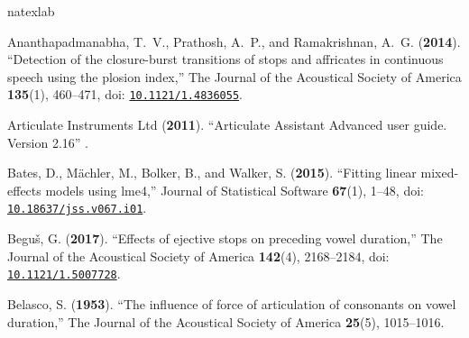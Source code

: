 \documentclass[preprint]{JASAnew}
\begin{document}
\begin{thebibliography}{75}
\def\enquote#1{``#1,''}
\def\plainquote#1{``#1''}
\expandafter\ifx\csname natexlab\endcsname\relax\def\natexlab#1{#1}\fi
\providecommand{\dourl}[1]{\href{http://#1}{\nolinkurl{#1}}}
\providecommand{\bibinfo}[2]{#2}
\providecommand{\noopsort}[1]{}
\providecommand{\switchargs}[2]{#2#1}
  \def\eatspace #1{#1}
\providecommand{\dodoi}[1]{doi: \href{http://dx.doi.org/#1}{\nolinkurl{#1}}}

\bibinfo{author}{Ananthapadmanabha, T.~V.}, \bibinfo{author}{Prathosh, A.~P.},
  and \bibinfo{author}{Ramakrishnan, A.~G.} (\textbf{\bibinfo{year}{2014}}).
  \enquote{\bibinfo{title}{Detection of the closure-burst transitions of stops
  and affricates in continuous speech using the plosion index}}
  \bibinfo{journal}{The Journal of the Acoustical Society of America}
  \textbf{135}(1), \bibinfo{pages}{460--471}, \dodoi{10.1121/1.4836055}.

\bibinfo{author}{{Articulate Instruments Ltd{\texttrademark}}}
  (\textbf{\bibinfo{year}{2011}}). \plainquote{\bibinfo{title}{{Articulate
  Assistant Advanced} user guide. {V}ersion 2.16}} .

\bibinfo{author}{Bates, D.}, \bibinfo{author}{M{\"a}chler, M.},
  \bibinfo{author}{Bolker, B.},  and \bibinfo{author}{Walker, S.}
  (\textbf{\bibinfo{year}{2015}}). \enquote{\bibinfo{title}{Fitting linear
  mixed-effects models using lme4}} \bibinfo{journal}{Journal of Statistical
  Software} \textbf{67}(1), \bibinfo{pages}{1--48},
  \dodoi{10.18637/jss.v067.i01}.

\bibinfo{author}{Begu{\v s}, G.} (\textbf{\bibinfo{year}{2017}}).
  \enquote{\bibinfo{title}{Effects of ejective stops on preceding vowel
  duration}} \bibinfo{journal}{The Journal of the Acoustical Society of
  America} \textbf{142}(4), \bibinfo{pages}{2168--2184},
  \dodoi{10.1121/1.5007728}.

\bibinfo{author}{Belasco, S.} (\textbf{\bibinfo{year}{1953}}).
  \enquote{\bibinfo{title}{The influence of force of articulation of consonants
  on vowel duration}} \bibinfo{journal}{The Journal of the Acoustical Society
  of America} \textbf{25}(5), \bibinfo{pages}{1015--1016}.


\end{thebibliography}
\end{document}
